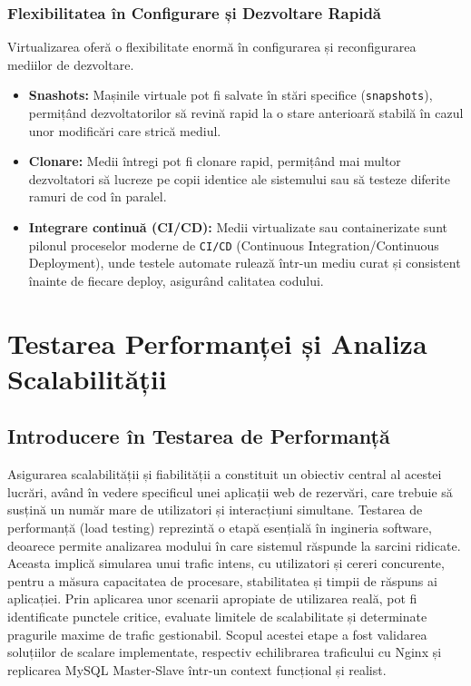 \documentclass[12pt, a4paper, oneside, romanian]{teza-upb}
\begin{document}
\subsection*{Flexibilitatea în Configurare și Dezvoltare Rapidă}
Virtualizarea oferă o flexibilitate enormă în configurarea și reconfigurarea mediilor de dezvoltare.
\begin{itemize}
	\item \textbf{Snashots:} Mașinile virtuale pot fi salvate în stări specifice (\texttt{snapshots}), permițând dezvoltatorilor să revină rapid la o stare anterioară stabilă în cazul unor modificări care strică mediul.
	\item \textbf{Clonare:} Medii întregi pot fi clonare rapid, permițând mai multor dezvoltatori să lucreze pe copii identice ale sistemului sau să testeze diferite ramuri de cod în paralel.
	\item \textbf{Integrare continuă (CI/CD):} Medii virtualizate sau containerizate sunt pilonul proceselor moderne de \texttt{CI/CD} (Continuous Integration/Continuous Deployment), unde testele automate rulează într-un mediu curat și consistent înainte de fiecare deploy, asigurând calitatea codului.
\end{itemize}





\chapter{Testarea Performanței și Analiza Scalabilității}

\section*{Introducere în Testarea de Performanță}
Asigurarea scalabilității și fiabilității a constituit un obiectiv central al acestei lucrări, având în vedere specificul unei aplicații web de rezervări, care trebuie să susțină un număr mare de utilizatori și interacțiuni simultane. Testarea de performanță (load testing) reprezintă o etapă esențială în ingineria software, deoarece permite analizarea modului în care sistemul răspunde la sarcini ridicate. Aceasta implică simularea unui trafic intens, cu utilizatori și cereri concurente, pentru a măsura capacitatea de procesare, stabilitatea și timpii de răspuns ai aplicației. Prin aplicarea unor scenarii apropiate de utilizarea reală, pot fi identificate punctele critice, evaluate limitele de scalabilitate și determinate pragurile maxime de trafic gestionabil. Scopul acestei etape a fost validarea soluțiilor de scalare implementate, respectiv echilibrarea traficului cu Nginx și replicarea MySQL Master-Slave într-un context funcțional și realist.
\end{document}
